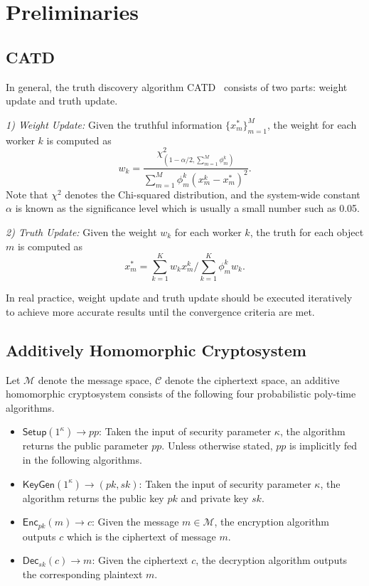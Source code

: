 \documentclass[conference]{IEEEtran}
\begin{document}
\section{Preliminaries}\label{sec4}
\subsection{CATD}
In general, the truth discovery algorithm CATD~\cite{li_confidence-aware_2014} consists of two parts: weight update and truth update.

\textit{1) Weight Update:} Given the truthful information $\{x_m^*\}_{m=1}^M$, the weight for each worker $k$ is computed as
\begin{equation*}
w_k = \frac{\chi^2_{(1-\alpha/2,\sum_{m=1}^M \phi_m^k)}}{\sum\limits_{m=1}^M \phi_m^k(x_m^k - x_m^*)^2}.
\end{equation*}
Note that $\chi^2$ denotes the Chi-squared distribution, and the system-wide constant $\alpha$ is known as the significance level which is usually a small number such as 0.05.

\textit{2) Truth Update:} Given the weight $w_k$ for each worker $k$, the truth for each object $m$ is computed as
\begin{equation*}
x_m^* = \sum\limits_{k=1}^K w_k x_m^k / \sum\limits_{k=1}^K \phi_m^k w_k.
\end{equation*}

In real practice, weight update and truth update should be executed iteratively to achieve more accurate results until the convergence criteria are met.

\subsection{Additively Homomorphic Cryptosystem}\label{sec4-b}
Let $\mathcal{M}$ denote the message space, $\mathcal{C}$ denote the ciphertext space, an additive homomorphic cryptosystem consists of the following four probabilistic poly-time algorithms.

\begin{itemize}
  \item $\mathsf{Setup}(1^\kappa)\to pp$: Taken the input of security parameter $\kappa$, the algorithm returns the public parameter $pp$. Unless otherwise stated, $pp$ is implicitly fed in the following algorithms.
  \item $\mathsf{KeyGen}(1^\kappa)\to (pk, sk)$: Taken the input of security parameter $\kappa$, the algorithm returns the public key $pk$ and private key $sk$.
  \item $\mathsf{Enc}_{pk}(m)\to c$: Given the message $m\in\mathcal{M}$, the encryption algorithm outputs $c$ which is the ciphertext of message $m$.
  \item $\mathsf{Dec}_{sk}(c)\to m$: Given the ciphertext $c$, the decryption algorithm outputs the corresponding plaintext $m$.
\end{itemize}
\end{document}
